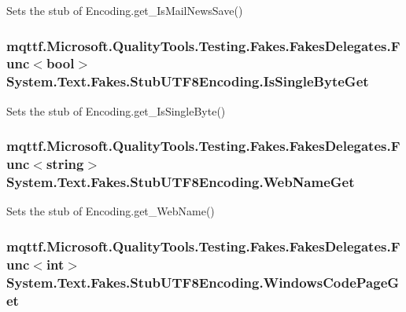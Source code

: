 Sets the stub of Encoding.\-get\-\_\-\-Is\-Mail\-News\-Save()

\hypertarget{class_system_1_1_text_1_1_fakes_1_1_stub_u_t_f8_encoding_a5dc2a6eab580cdc6946d2aa988a191e5}{
\subsubsection[{Is\-Single\-Byte\-Get}]{\setlength{\rightskip}{0pt plus 5cm}mqttf.\-Microsoft.\-Quality\-Tools.\-Testing.\-Fakes.\-Fakes\-Delegates.\-Func$<$bool$>$ System.\-Text.\-Fakes.\-Stub\-U\-T\-F8\-Encoding.\-Is\-Single\-Byte\-Get}}\label{class_system_1_1_text_1_1_fakes_1_1_stub_u_t_f8_encoding_a5dc2a6eab580cdc6946d2aa988a191e5}


Sets the stub of Encoding.\-get\-\_\-\-Is\-Single\-Byte()

\hypertarget{class_system_1_1_text_1_1_fakes_1_1_stub_u_t_f8_encoding_a3dbaf6f344e57e3cf819c6b23eda7727}{
\subsubsection[{Web\-Name\-Get}]{\setlength{\rightskip}{0pt plus 5cm}mqttf.\-Microsoft.\-Quality\-Tools.\-Testing.\-Fakes.\-Fakes\-Delegates.\-Func$<$string$>$ System.\-Text.\-Fakes.\-Stub\-U\-T\-F8\-Encoding.\-Web\-Name\-Get}}\label{class_system_1_1_text_1_1_fakes_1_1_stub_u_t_f8_encoding_a3dbaf6f344e57e3cf819c6b23eda7727}


Sets the stub of Encoding.\-get\-\_\-\-Web\-Name()

\hypertarget{class_system_1_1_text_1_1_fakes_1_1_stub_u_t_f8_encoding_ad959790f105d1b7f8d3db62fa0ab8e8f}{
\subsubsection[{Windows\-Code\-Page\-Get}]{\setlength{\rightskip}{0pt plus 5cm}mqttf.\-Microsoft.\-Quality\-Tools.\-Testing.\-Fakes.\-Fakes\-Delegates.\-Func$<$int$>$ System.\-Text.\-Fakes.\-Stub\-U\-T\-F8\-Encoding.\-Windows\-Code\-Page\-Get}}\label{class_system_1_1_text_1_1_fakes_1_1_stub_u_t_f8_encoding_ad959790f105d1b7f8d3db62fa0ab8e8f}


